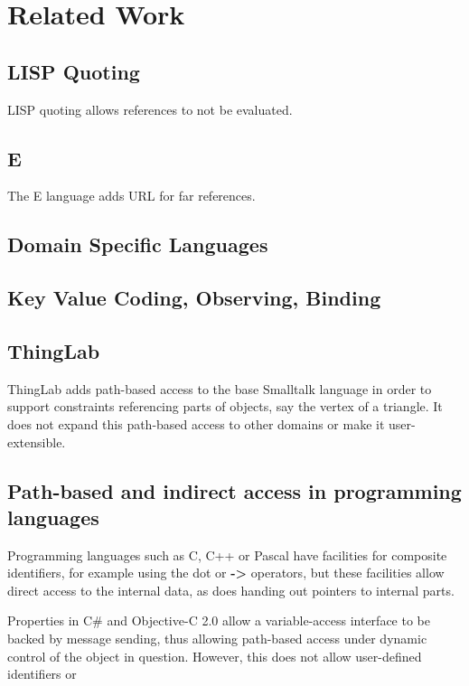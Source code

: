 \documentclass[preprint,authoryear]{acm_proc_article-sp}
\begin{document}
\section{Related Work}

\subsection{LISP Quoting}

LISP quoting allows references to not be evaluated.

\subsection{E}

The E language\cite{MillerRobustComposition}  adds URL for far references.

\subsection{Domain Specific Languages}

\subsection{Key Value Coding, Observing, Binding}

\subsection{ThingLab}

ThingLab adds path-based access to the base Smalltalk language in order to support
constraints referencing parts of objects, say the vertex of a triangle.   It does not
expand this path-based access to other domains or make it user-extensible.

\subsection{Path-based and indirect access in programming languages}

Programming languages such as C, C++ or Pascal have facilities for composite
identifiers, for example using the dot or {\bf -> } operators, but these facilities allow
direct access to the internal data, as does handing out pointers to internal parts.

Properties in C\# and Objective-C 2.0 allow a variable-access interface to be backed by 
message sending, thus allowing path-based access under dynamic control of the object
in question.  However, this does not allow user-defined identifiers or 
\end{document}
